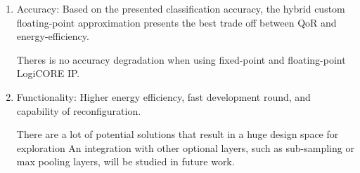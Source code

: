 \begin{enumerate}
	\item{Accuracy}: Based on the presented classification accuracy, the hybrid custom floating-point approximation presents the best trade off between QoR and energy-efficiency.
	
	Theres is no accuracy degradation when using fixed-point and floating-point LogiCORE IP.

	\item{Functionality}: Higher energy efficiency, fast development round, and capability of reconfiguration.

	There are a lot of potential solutions that result in a huge design space for exploration
	An integration with other optional layers, such as sub-sampling or max pooling layers, will be studied in future work.
\end{enumerate}